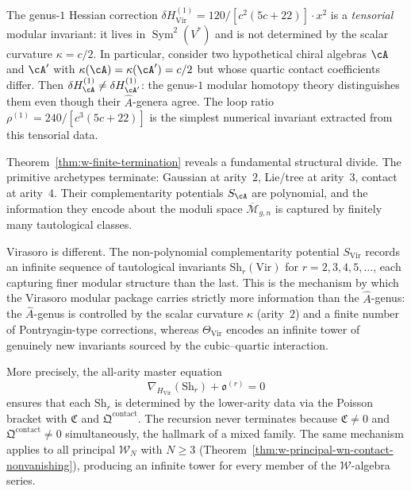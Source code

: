 \begin{remark}
\label{rem:w-virasoro-tensorial-invariant}
The genus-$1$ Hessian correction
$\delta H^{(1)}_{\mathrm{Vir}} = 120/[c^2(5c+22)] \cdot x^2$
is a \emph{tensorial} modular invariant: it lives in
$\operatorname{Sym}^2(V^*)$ and is not determined by the scalar
curvature $\kappa = c/2$.  In particular, consider two hypothetical
chiral algebras $\cA$ and $\cA'$ with
$\kappa(\cA) = \kappa(\cA') = c/2$ but whose quartic contact
coefficients differ.  Then
$\delta H^{(1)}_{\cA} \neq \delta H^{(1)}_{\cA'}$:
the genus-$1$ modular homotopy theory distinguishes them even
though their $\hat{A}$-genera agree.  The loop ratio
$\rho^{(1)} = 240/[c^3(5c+22)]$ is the simplest numerical
invariant extracted from this tensorial data.
\end{remark}

\begin{remark}
\label{rem:w-infinite-tower-beyond-ahat}
Theorem~\ref{thm:w-finite-termination} reveals a fundamental structural
divide.  The primitive archetypes terminate: Gaussian at arity~$2$,
Lie/tree at arity~$3$, contact at arity~$4$.  Their complementarity
potentials $S_{\cA}$ are polynomial, and the information they encode
about the moduli space $\overline{\mathcal{M}}_{g,n}$ is captured by
finitely many tautological classes.

Virasoro is different.  The non-polynomial complementarity potential
$S_{\mathrm{Vir}}$ records an infinite sequence of tautological
invariants $\mathrm{Sh}_r(\mathrm{Vir})$ for $r=2,3,4,5,\dots$,
each capturing finer modular structure than the last.  This is the
mechanism by which the Virasoro modular package carries strictly more
information than the $\hat{A}$-genus: the $\hat{A}$-genus is
controlled by the scalar curvature $\kappa$ (arity~$2$) and a finite
number of Pontryagin-type corrections, whereas
$\Theta_{\mathrm{Vir}}$ encodes an infinite tower of genuinely new
invariants sourced by the cubic--quartic interaction.

More precisely, the all-arity master equation
\[
\nabla_{H_{\mathrm{Vir}}}(\mathrm{Sh}_r)
+\mathfrak o^{(r)}=0
\]
ensures that each $\mathrm{Sh}_r$ is determined by the lower-arity
data via the Poisson bracket with $\mathfrak C$ and
$\mathfrak Q^{\mathrm{contact}}$.  The recursion never terminates
because $\mathfrak C\neq 0$ and $\mathfrak Q^{\mathrm{contact}}\neq 0$
simultaneously, the hallmark of a mixed family.  The same mechanism
applies to all principal $\mathcal{W}_N$ with $N\ge 3$
(Theorem~\ref{thm:w-principal-wn-contact-nonvanishing}), producing an
infinite tower for every member of the $\mathcal{W}$-algebra series.
\end{remark}

